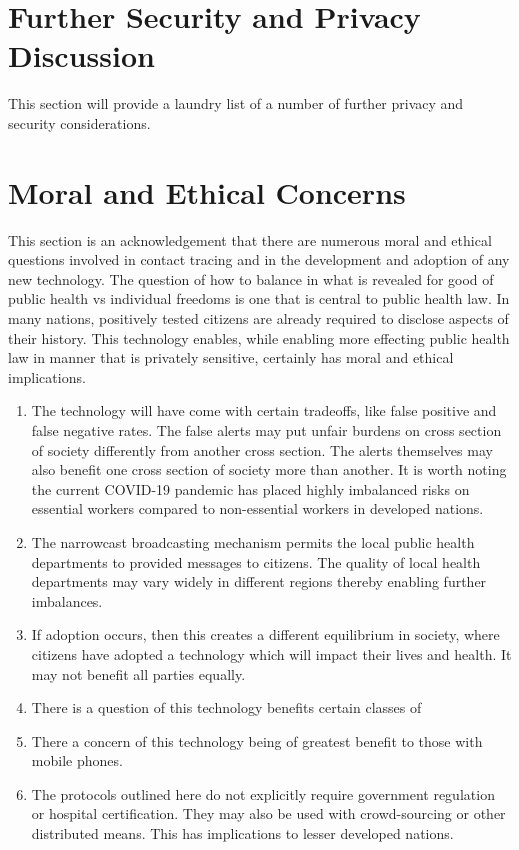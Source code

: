 \documentclass{article}
\begin{document}
\section{Further Security and Privacy Discussion}
This section will provide a laundry list of a number of further privacy and security considerations.

\section{Moral and Ethical Concerns}
This section is an acknowledgement that there are numerous moral and ethical questions involved in contact tracing and in the development and adoption of any new technology. The question of how to balance in what is revealed for good of public health vs individual freedoms is one that is central to public health law. In many nations, positively tested citizens are already required to disclose aspects of their history.  This technology enables, while enabling more effecting public health law in manner that is privately sensitive, certainly has moral and ethical implications.  

\begin{enumerate}
\item The technology will have come with certain tradeoffs, like false positive and false negative rates.  The false alerts may put unfair burdens on cross section of society differently from another cross section.  The alerts themselves may also benefit one cross section of society more than another. It is worth noting the current COVID-19 pandemic has placed highly imbalanced risks on essential workers compared to non-essential workers in developed nations.
\item The narrowcast broadcasting mechanism permits the local public health departments to provided messages to citizens. The quality of local health departments may vary widely in different regions thereby enabling further imbalances.
\item If adoption occurs, then this creates a different equilibrium in society, where citizens have adopted a technology which will impact their lives and health. It may not benefit all parties equally.
\item There is a question of this technology benefits certain classes of 
\item There a concern of this technology being of greatest benefit to those with mobile phones.
\item The protocols outlined here do not explicitly require government regulation or hospital certification. They may also be used with crowd-sourcing or other distributed means. This has implications to lesser developed nations.
\end{enumerate}
\end{document}
